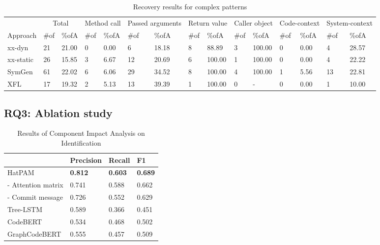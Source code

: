 \documentclass[acmsmall,screen,review,anonymous]{acmart} %
\begin{document}
\renewcommand\arraystretch{1.15}
\begin{table}
  \centering
  \footnotesize
\caption{Recovery results for complex patterns}\label{tab:dy2}
\begin{tabular}{p{1cm}p{.3cm}p{.7cm}p{.3cm}p{.7cm}p{.6cm}p{1cm}p{.4cm}p{.7cm}p{.4cm}p{.7cm}p{.4cm}p{.7cm}p{.5cm}p{.5cm}}
\toprule
& \multicolumn{2}{c}{Total} & \multicolumn{2}{c}{Method call} & \multicolumn{2}{c}{Passed arguments} & \multicolumn{2}{c}{Return value} & \multicolumn{2}{c}{Caller object}&\multicolumn{2}{c}{Code-context}&\multicolumn{2}{c}{System-context}\\
Approach & \#of & \%ofA & \#of & \%ofA & \#of & \%ofA & \#of & \%ofA & \#of & \%ofA & \#of & \%ofA & \#of & \%ofA\\
\midrule
xx-dyn & 21  & 21.00 & 0  &0.00 &6 &18.18 & 8 &88.89 &3 &100.00 &0 &0.00 &4 &28.57  \\
xx-static& 26 & 15.85 & 3 &6.67 & 12 & 20.69 &6 &100.00 &1 &100.00 &0 &0.00 &4 &22.22 \\
SymGen&61   & 22.02& 6 &6.06  & 29 &34.52 &8 &100.00 &4 &100.00 &1 &5.56 &13 &22.81 \\
XFL& 17  & 19.32 & 2 & 5.13 & 13 & 39.39 &1 &100.00 &0 &\mbox{-} &0 &0.00 &1 &10.00  \\
\bottomrule
\end{tabular}
\end{table}
\renewcommand\arraystretch{1.0}
\fi

\subsection{RQ3: Ablation study}

\begin{table}
  \centering
  \scriptsize
  \caption{Results of Component Impact Analysis on Identification}
  \renewcommand\arraystretch{1.31}
    \begin{tabular}{p{3cm}p{1.5cm}p{1.5cm}p{1cm}}
    \toprule
     &  \textbf{Precision} & \textbf{Recall} & \textbf{F1} \\
    \hline
    HatPAM & \textbf{0.812} & \textbf{0.603} & \textbf{0.689}\\
    - Attention matrix & 0.741 & 0.588 & 0.662 \\
    - Commit message  & 0.726 & 0.552 & 0.629 \\
    \hline
    Tree-LSTM & 0.589 & 0.366 & 0.451 \\ \hline
    CodeBERT & 0.534 & 0.468 & 0.502 \\ \hline
    GraphCodeBERT & 0.555 & 0.457 & 0.509 \\ 
    \hline
    \end{tabular}%
\end{table}%
\renewcommand\arraystretch{1.0}
\end{document}
